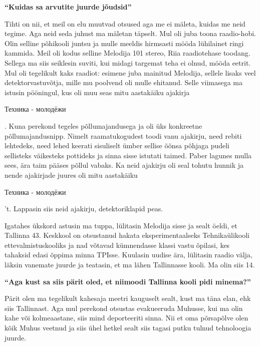 
\textbf{\enquote{Kuidas sa arvutite juurde jõudsid}}

Tihti on nii, et meil on elu muutvad otsused aga me ei mäleta, kuidas me neid tegime. Aga neid seda juhust ma mäletan täpselt. Mul oli juba toona raadio-hobi. Olin selline põhikooli juntsu ja mulle meeldis hirmsasti mööda lühilainet ringi kammida. Meil oli kodus selline Melodija 101 stereo, Riia raadiotehase toodang. Sellega ma siis seiklesin suviti, kui midagi targemat teha ei olnud, mööda eetrit. Mul oli tegelikult kaks raadiot: esimene juba mainitud Melodija, sellele lisaks veel detektorvastuvõtja, mille mu poolvend oli mulle ehitanud. Selle viimasega ma istusin pööningul, kus oli muu seas mitu aastakäiku ajakirja \begin{russian}Техника - молодёжи\end{russian}. Kuna perekond tegeles põllumajandusega ja oli üks konkreetne põllumajandusnipp. Nimelt raamatukogudest toodi vanu ajakirju, need rebiti lehtedeks, need lehed keerati sisuliselt ümber sellise õõnsa põhjaga pudeli sellisteks väikesteks pottideks ja  sinna sisse istutati taimed. Paber lagunes mulla sees, ära taim pääses põllul vabaks. Ka neid ajakirju oli seal tohutu hunnik ja nende ajakirjade juures oli mitu aastakäiku \begin{russian}Техника - молодёжи\end{russian}'t. Lappasin siis neid ajakirju, detektoriklapid peas. 

Igatahes ükskord astusin ma tuppa, lülitasin Melodija sisse ja sealt öeldi, et Tallinna 43. Keskkool on otsustanud hakata eksperimentaalseks Tehnikaülikooli ettevalmistuskooliks ja nad võtavad kümnendasse klassi vastu õpilasi, kes tahaksid edasi õppima minna TPIsse. Kuulasin uudise ära, lülitasin raadio välja, läksin vanemate juurde ja teatasin, et ma lähen Tallinnasse kooli. Ma olin siis 14.


\textbf{\enquote{Aga kust sa siis pärit oled, et niimoodi Tallinna kooli pidi minema?}}


Pärit olen ma tegelikult kahesaja meetri kauguselt sealt, kust ma täna elan, ehk siis Tallinnast. Aga mul perekond otsustas evakueeruda Muhusse, kui ma olin kahe või kolmeaastane, siis mind deporteeriti sinna. Nii et oma põrsapõlve olen kõik Muhus  veetnud ja siis ühel hetkel sealt siis tagasi putku tulnud tehnoloogia juurde. 

